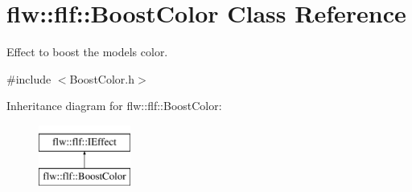 \hypertarget{classflw_1_1flf_1_1BoostColor}{}\section{flw\+:\+:flf\+:\+:Boost\+Color Class Reference}
\label{classflw_1_1flf_1_1BoostColor}


Effect to boost the models color.  




{\ttfamily \#include $<$Boost\+Color.\+h$>$}

Inheritance diagram for flw\+:\+:flf\+:\+:Boost\+Color\+:\begin{figure}[H]
\begin{center}
\leavevmode
\includegraphics[height=2.000000cm]{classflw_1_1flf_1_1BoostColor}
\end{center}
\end{figure}
